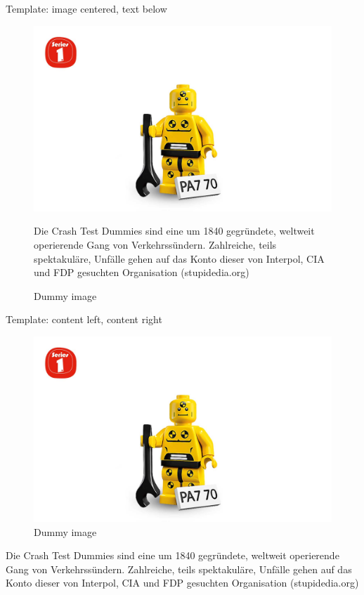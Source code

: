 \documentclass[shortpres]{beamer}
\newcommand{\imgvoffset}{-20pt}
\newcommand{\imgfullscale}{0.75}
\begin{document}
\begin{frame}{Template: image centered, text below}
	\begin{figure}[t]
		\vspace{\imgvoffset}
		\includegraphics[clip, width=\imgfullscale\linewidth]{img/dummy_image.jpg}
		\caption*{Dummy image}
		Die Crash Test Dummies sind eine um 1840 gegründete, weltweit operierende Gang von Verkehrssündern. Zahlreiche, teils spektakuläre, Unfälle gehen auf das Konto dieser von Interpol, CIA und FDP gesuchten Organisation (stupidedia.org)
	\end{figure}
\end{frame}

\begin{frame}{Template: content left, content right}
	\begin{multicols}{2}
		\begin{figure}[t]
			\includegraphics[clip, width=0.98\linewidth]{img/dummy_image.jpg}
			\caption*{Dummy image}
		\end{figure}		
		
	\columnbreak
	
		Die Crash Test Dummies sind eine um 1840 gegründete, weltweit operierende Gang von Verkehrssündern. Zahlreiche, teils spektakuläre, Unfälle gehen auf das Konto dieser von Interpol, CIA und FDP gesuchten Organisation (stupidedia.org)
	\end{multicols}
\end{frame}
\end{document}
